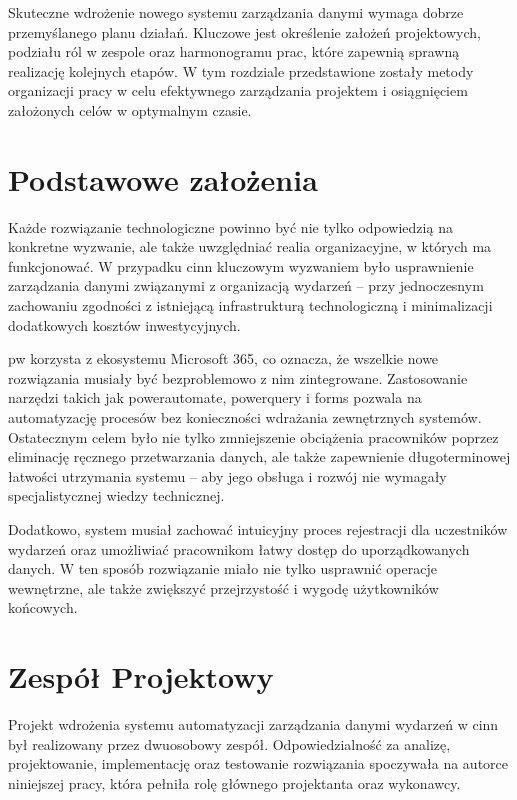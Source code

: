 Skuteczne wdrożenie nowego systemu zarządzania danymi wymaga dobrze przemyślanego planu działań. Kluczowe jest określenie założeń projektowych, podziału ról w zespole oraz harmonogramu prac, które zapewnią sprawną realizację kolejnych etapów. W tym rozdziale przedstawione zostały metody organizacji pracy w celu efektywnego zarządzania projektem i osiągnięciem założonych celów w optymalnym czasie.

\section{Podstawowe założenia}

Każde rozwiązanie technologiczne powinno być nie tylko odpowiedzią na konkretne wyzwanie, ale także uwzględniać realia organizacyjne, w których ma funkcjonować. W przypadku \gls{cinn} kluczowym wyzwaniem było usprawnienie zarządzania danymi związanymi z organizacją wydarzeń – przy jednoczesnym zachowaniu zgodności z istniejącą infrastrukturą technologiczną i minimalizacji dodatkowych kosztów inwestycyjnych.

\gls{pw} korzysta z ekosystemu Microsoft 365, co oznacza, że wszelkie nowe rozwiązania musiały być bezproblemowo z nim zintegrowane. Zastosowanie narzędzi takich jak \gls{powerautomate}, \gls{powerquery} i \gls{forms} pozwala na automatyzację procesów bez konieczności wdrażania zewnętrznych systemów. Ostatecznym celem było nie tylko zmniejszenie obciążenia pracowników poprzez eliminację ręcznego przetwarzania danych, ale także zapewnienie długoterminowej łatwości utrzymania systemu – aby jego obsługa i rozwój nie wymagały specjalistycznej wiedzy technicznej.

Dodatkowo, system musiał zachować intuicyjny proces rejestracji dla uczestników wydarzeń oraz umożliwiać pracownikom łatwy dostęp do uporządkowanych danych. W ten sposób rozwiązanie miało nie tylko usprawnić operacje wewnętrzne, ale także zwiększyć przejrzystość i wygodę użytkowników końcowych.


\section{Zespół Projektowy} 
Projekt wdrożenia systemu automatyzacji zarządzania danymi wydarzeń w \gls{cinn} był realizowany przez dwuosobowy zespół. Odpowiedzialność za analizę, projektowanie, implementację oraz testowanie rozwiązania spoczywała na autorce niniejszej pracy, która pełniła rolę głównego projektanta oraz wykonawcy.

